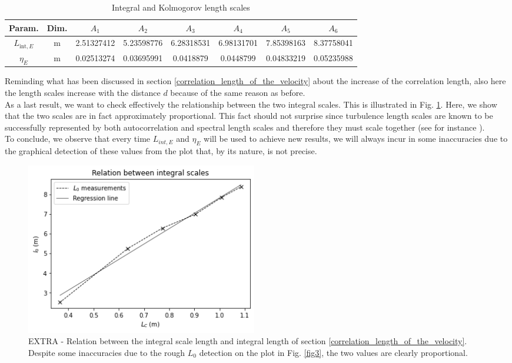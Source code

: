 \documentclass[11pt,titlepage]{article}
\begin{document}
\begin{table}[h]
\centering
\caption{Integral and Kolmogorov length scales}\label{tab3}
    \begin{tabular}{ | c | c | c | c | c | c | c | c |}
    \hline
    Param. & Dim. & $A_1$ & $A_2$ & $A_3$ & $A_4$ & $A_5$ & $A_6$ \\
    \hline
    $L_{\mathrm{int},E}$ & m &2.51327412 &5.23598776& 6.28318531& 6.98131701& 7.85398163 &8.37758041 \\
    \hline
    $\eta_E$ & m& 0.02513274 &0.03695991 &0.0418879&  0.0448799&  0.04833219& 0.05235988  \\
    \hline
    \end{tabular}
\end{table}
Reminding what has been discussed in section \ref{correlation_length_of_the_velocity} about the increase of the correlation length, also here the length scales increase with the distance $d$ because of the same reason as before. \\
As a last result, we want to check effectively the relationship between the two integral scales. This is illustrated in Fig. \ref{fig4}. Here, we show that the two scales are in fact approximately proportional. This fact should not surprise since turbulence length scales are known to be successfully represented by both autocorrelation and spectral length scales and therefore they must scale together (see for instance \cite{trush_2020}).\\
To conclude, we observe that every time $L_{int,E}$ and $\eta_E$ will be used to achieve new results, we will always incur in some inaccuracies due to the graphical detection of these values from the plot that, by its nature, is not precise.
	\begin{center} 
	\begin{figure} [h]
		\centering
		\includegraphics[width = 4in]{./figures/ex1_3_plus.png}
		\caption{EXTRA - Relation between the integral scale length and integral length of section \ref{correlation_length_of_the_velocity}. Despite some inaccuracies due to the rough $L_0$ detection on the plot in Fig. \ref{fig3}, the two values are clearly proportional.}
		\label{fig4}
	\end{figure}
\end{center}
\end{document}
